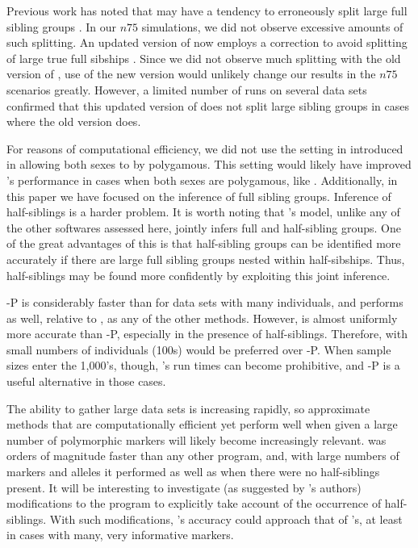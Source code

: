 Previous work has noted that \colony{} may have a tendency to erroneously split large full sibling groups
\citep{alm&and11}.  In our $n75$ simulations, we did not observe excessive amounts of such
splitting. An updated version of \colony{} now employs a correction
to avoid splitting of large true full sibships \citep{Wang2013}.  Since we did not observe 
much splitting with the old version of \colony{}, use of the new version would unlikely change
our results in the $n75$ scenarios greatly.  However, a limited number of runs on several
\lottalarge{} data sets confirmed
that this updated version of \colony{} does not split large sibling groups in cases where the
old version does.


For reasons of computational efficiency, we did not use the setting in \colony{} introduced in
\citet{wang09} allowing both sexes to by polygamous.  This setting would likely have
improved \colony{}'s performance in cases when both sexes are polygamous, like \allhalf{}. Additionally,
in this paper we have focused on the inference of full sibling groups. Inference of half-siblings 
is a harder problem.  It is worth noting that \colony{}'s model, unlike any of the other softwares
assessed here, jointly infers full and half-sibling groups.  One of the great advantages of this 
is that half-sibling groups can be identified more accurately if there are large full sibling
groups nested within half-sibships.  Thus, half-siblings may be found more confidently by exploiting
this joint inference.


\colony-P \citep{Wang2012pairwise} is considerably faster than \colony{} for data sets with
many individuals, and performs as well, relative to \colony{}, as any of the other methods.
However, \colony{} is almost uniformly more accurate than 
\colony-P, especially in the presence of half-siblings. Therefore, with small numbers of 
individuals (100s) \colony{} would be preferred over \colony-P.  When sample sizes enter
the 1,000's, though, \colony{}'s run times can become prohibitive, and \colony-P is a
useful alternative in those cases.  

The ability to gather large data sets is 
increasing rapidly, so approximate methods that are computationally efficient yet
perform well when given a large number of polymorphic markers 
will likely become increasingly relevant.
\familyfinder{} was orders of magnitude faster than any other program, and, with large numbers of 
markers and alleles it performed as well as \colony{} when there were no half-siblings present.  It 
will be interesting to investigate (as suggested by \familyfinder{}'s authors) modifications to the
program to
explicitly take account of the occurrence of half-siblings.  With such modifications,
\familyfinder{}'s accuracy could approach that of \colony{}'s,
at least in cases with many, very informative markers.


